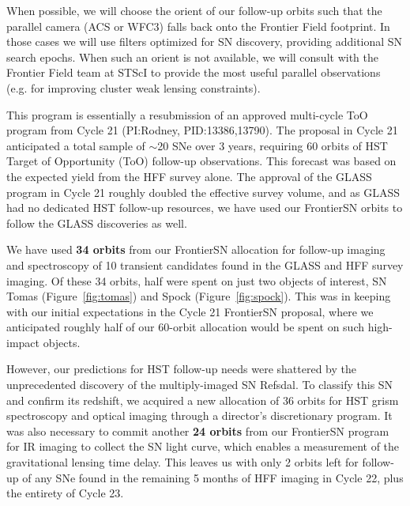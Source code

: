 \documentclass[12pt]{article}
\begin{document}
%
%
\coordinatedobs          %


When possible, we will choose the orient of our follow-up orbits such
that the parallel camera (ACS or WFC3) falls back onto the Frontier
Field footprint.  In those cases we will use filters optimized for SN
discovery, providing additional SN search epochs.  When such an orient
is not available, we will consult with the Frontier Field team at
STScI to provide the most useful parallel observations (e.g. for
improving cluster weak lensing constraints).



%
%
\duplications           %

This program is essentially a resubmission of an approved multi-cycle
ToO program from Cycle 21 (PI:Rodney, PID:13386,13790). The proposal
in Cycle 21 anticipated a total sample of $\sim$20 SNe over 3 years,
requiring 60 orbits of HST Target of Opportunity (ToO) follow-up
observations.  This forecast was based on the expected yield from the
HFF survey alone.  The approval of the GLASS program in Cycle 21
roughly doubled the effective survey volume, and as GLASS had no
dedicated HST follow-up resources, we have used our FrontierSN orbits
to follow the GLASS discoveries as well.

We have used {\bf 34 orbits} from our FrontierSN allocation for follow-up
imaging and spectroscopy of 10 transient candidates found in the GLASS
and HFF survey imaging.  Of these 34 orbits, half were spent on just
two objects of interest, SN Tomas (Figure~\ref{fig:tomas}) and Spock
(Figure~\ref{fig:spock}).  This was in keeping with our initial
expectations in the Cycle 21 FrontierSN proposal, where we anticipated
roughly half of our 60-orbit allocation would be spent on such
high-impact objects.

However, our predictions for HST follow-up needs were shattered by the
unprecedented discovery of the multiply-imaged SN Refsdal.  To
classify this SN and confirm its redshift, we acquired a new
allocation of 36 orbits for HST grism spectroscopy and optical imaging
through a director's discretionary program.  It was also necessary to
commit another {\bf 24 orbits} from our FrontierSN program for IR
imaging to collect the SN light curve, which enables a measurement of
the gravitational lensing time delay.  This leaves us with only 2
orbits left for follow-up of any SNe found in the remaining 5 months
of HFF imaging in Cycle 22, plus the entirety of Cycle 23.
\end{document}
